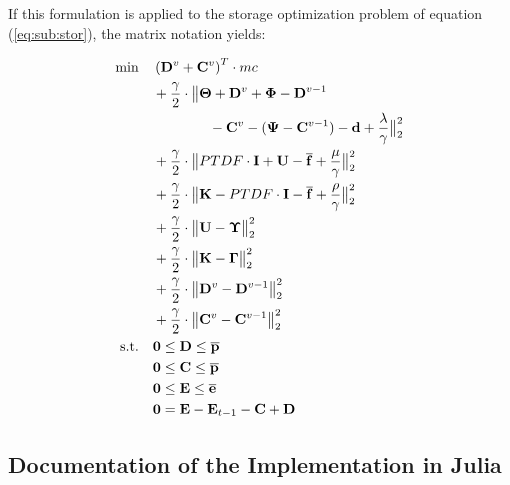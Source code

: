 If this formulation is applied to the storage optimization problem of equation (\ref{eq:sub:stor}), the matrix notation yields:

 \begin{subequations}
	\begin{align}
		 \min \quad & \left(\vb{D}^v + \vb{C}^v\right)^T \cdot mc\\
		 & + \frac{\gamma}{2} \cdot \big\| \vb{\Theta} + \vb{D}^v + \vb{\Phi} - \vb{D}^{v-1} \nonumber \\
		 & \qquad \qquad - \vb{C}^v - (\vb{\Psi} - \vb{C}^{v-1}) - \vb{d} + \frac{\vb{\lambda}}{\gamma} \big\|^2_2 \nonumber \\
		 & + \frac{\gamma}{2} \cdot \big\| PTDF \cdot \vb{I} + \vb{U} - \vb{\overline{f}} + \frac{\vb{\mu}}{\gamma}\big\|^2_2 \nonumber \\
		 & + \frac{\gamma}{2} \cdot \big\| \vb{K} - PTDF \cdot \vb{I} - \vb{\overline{f}} + \frac{\vb{\rho}}{\gamma}\big\|^2_2 \nonumber \\
		 & + \frac{\gamma}{2} \cdot \big\| \vb{U} - \vb{\Upsilon} \big\|^2_2 \nonumber\\
		 & + \frac{\gamma}{2} \cdot \big\| \vb{K} - \vb{\Gamma} \big\|^2_2 \nonumber \\
		 & + \frac{\gamma}{2} \cdot \big\| \vb{D}^v - \vb{D}^{v-1}\big\|^2_2 \nonumber \\
		 & + \frac{\gamma}{2} \cdot \big\| \vb{C}^v - \vb{C}^{v-1}\big\|^2_2 \nonumber \\
		 \text{s.t.} \quad & \vb{0} \leq \vb{D} \leq \vb{\overline{p}} \\
		 & \vb{0} \leq \vb{C} \leq \vb{\overline{p}} \\
		 & \vb{0} \leq \vb{E} \leq \vb{\overline{e}}\\
		 & \vb{0} = \vb{E} - \vb{E}_{t-1} - \vb{C} + \vb{D}
	\end{align}
\end{subequations}


\subsection{Documentation of the Implementation in Julia}


